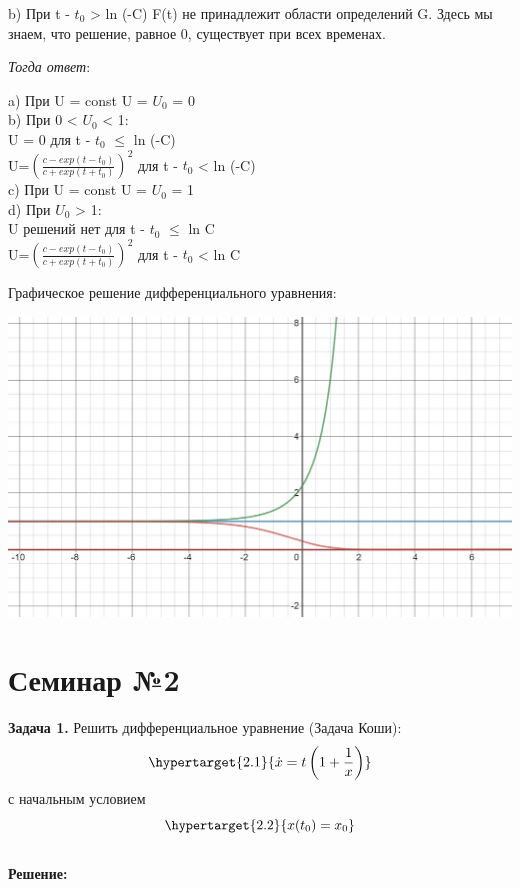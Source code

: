 \documentclass[10pt]{report}
\begin{document}
b) При  t - $t_0$ > ln (-C) F(t) не принадлежит области определений G. 
Здесь мы знаем, что решение, равное 0, существует при всех временах.

\bigskip
\textit{Тогда ответ}: \par
\bigskip

a) При U = const U = $U_0$ = 0\\

b) При 0 < $U_0$ < 1:\\
U = 0 для t - $t_0$ $\leq$ ln (-C)\\
U=$\left( \frac {c-exp(t-t_0)} {c+exp(t+t_0)} \right)^2$ для  t - $t_0$ < ln (-C)
\\

c) При U = const U = $U_0$ = 1
\\

d) При $U_0$ > 1:\\
U решений нет для t - $t_0$ $\leq$ ln C\\
U=$\left( \frac {c-exp(t-t_0)} {c+exp(t+t_0)} \right)^2$ для  t - $t_0$ < ln C \par
\bigskip

Графическое решение дифференциального уравнения:

\begin{center}
{\includegraphics[scale=0.4]{graph1.1.jpg}}
\end{center}

\chapter[{Семинар №2}]{Семинар №2}
\thispagestyle{empty}
\textbf{Задача 1.} Решить дифференциальное уравнение (Задача Коши): 
\newline
\begin{equation}
\hypertarget{2.1}{\dot{x} = t\left(1+ \frac {1} {x}\right)}
\end{equation}
\newline
с начальным условием
\newline
\begin{equation}
\hypertarget{2.2}{x(t_0)=x_0}
\end{equation}\\
\textbf{Решение:} 
\end{document}
